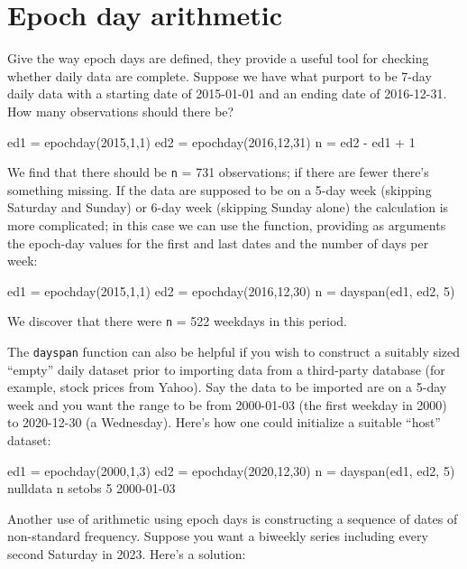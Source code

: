 \section{Epoch day arithmetic}
\label{sec:cal-arith}

Give the way epoch days are defined, they provide a useful tool for
checking whether daily data are complete. Suppose we have what purport
to be 7-day daily data with a starting date of 2015-01-01 and an
ending date of 2016-12-31. How many observations should there be?
%
\begin{code}
ed1 = epochday(2015,1,1)
ed2 = epochday(2016,12,31)
n = ed2 - ed1 + 1
\end{code}
We find that there should be \texttt{n} = 731 observations; if there
are fewer there's something missing. If the data are supposed to be
on a 5-day week (skipping Saturday and Sunday) or 6-day week (skipping
Sunday alone) the calculation is more complicated; in this case we can
use the  function, providing as arguments the
epoch-day values for the first and last dates and the number of days
per week:
\begin{code}
ed1 = epochday(2015,1,1)
ed2 = epochday(2016,12,30)
n = dayspan(ed1, ed2, 5)
\end{code}
%
We discover that there were \texttt{n} = 522 weekdays in this period.

The \texttt{dayspan} function can also be helpful if you wish to
construct a suitably sized ``empty'' daily dataset prior to importing
data from a third-party database (for example, stock prices from
\textsf{Yahoo}). Say the data to be imported are on a 5-day week and
you want the range to be from 2000-01-03 (the first weekday in 2000)
to 2020-12-30 (a Wednesday). Here's how one could initialize a
suitable ``host'' dataset:
\begin{code}
ed1 = epochday(2000,1,3)
ed2 = epochday(2020,12,30)
n = dayspan(ed1, ed2, 5)
nulldata n
setobs 5 2000-01-03
\end{code}

Another use of arithmetic using epoch days is constructing a sequence
of dates of non-standard frequency. Suppose you want a biweekly series
including every second Saturday in 2023. Here's a solution:

